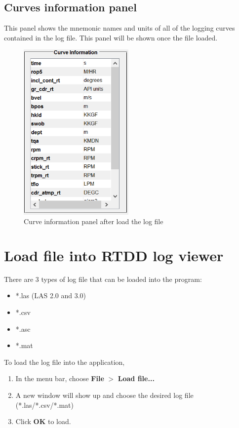\documentclass[12pt,a4paper,oneside]{report}
\begin{document}
\subsection{Curves information panel}
This panel shows the mnemonic names and units of all of the logging curves contained in the log file. This panel will be shown once the file loaded.
\begin{figure}[h!]
\centering
\includegraphics[width=0.5\textwidth]{available_curve_panel.PNG}
\caption{Curve information panel after load the log file}
\label{fig:curve_info_panel}
\end{figure}

\section{Load file into RTDD log viewer}
There are 3 types of log file that can be loaded into the program:
\begin{itemize}
\setlength\itemsep{0.1em}
\item *.las (LAS 2.0 and 3.0)
\item *.csv
\item *.asc
\item *.mat
\end{itemize}

\noindent To load the log file into the application,
\begin{enumerate}
\setlength\itemsep{0.1em}
\item In the menu bar, choose \textbf{File} $>$ \textbf{Load file...}
\item A new window will show up and choose the desired log file (*.las/*.csv/*.mat)
\item Click \textbf{OK} to load.
\end{enumerate}
\end{document}
